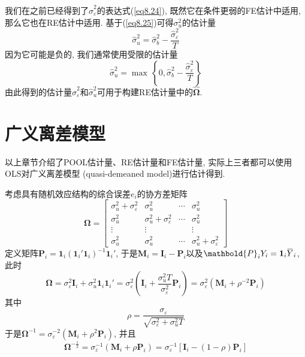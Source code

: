 \documentclass[cn, 12pt, math=mtpro2, bibstyle=apa, blue, twocol]{elegantbook}
\newcommand{\M}{\mathbold{M}}
\newcommand{\BO}{\mathbold{\Omega}}
\newcommand{\overbar}[1]{\mkern 1.5mu\overline{\mkern-1.5mu#1\mkern-1.5mu}\mkern 1.5mu}
\begin{document}
我们在之前已经得到了$\hat{\sigma}_\varepsilon^2$的表达式(\ref{eq8.24}), 既然它在条件更弱的FE估计中适用, 那么它也在RE估计中适用. 基于(\ref{eq8.25})可得$\sigma_u^2$的估计量
$$\hat{\sigma}_u^2=\hat{\sigma}_b^2-\frac{\hat{\sigma}_\varepsilon^2}{T}$$
因为它可能是负的, 我们通常使用受限的估计量
\begin{equation}\label{eq8.26}
  \hat{\sigma}_u^2=\max\,\left\{0,\hat{\sigma}_b^2-\frac{\hat{\sigma}_\varepsilon^2}{T}\right\}
\end{equation}
由此得到的估计量$\hat{\sigma}_\varepsilon^2$和$\hat{\sigma}_u^2$可用于构建RE估计量中的$\hat{\BO}$.
\section{广义离差模型}
以上章节介绍了POOL估计量、RE估计量和FE估计量, 实际上三者都可以使用OLS对广义离差模型 (quasi-demeaned model)进行估计得到.

考虑具有随机效应结构的综合误差$e_i$的协方差矩阵
$$\BO=\begin{bmatrix}
   \sigma_u^2+\sigma_\varepsilon^2 & \sigma_u^2 & \cdots & \sigma_u^2 \\
   \sigma_u^2 & \sigma_u^2+\sigma_\varepsilon^2 & \cdots & \sigma_u^2 \\
   \vdots & \vdots &  & \vdots \\
   \sigma_u^2 & \sigma_u^2 & \cdots & \sigma_u^2+\sigma_\varepsilon^2
 \end{bmatrix}$$
定义矩阵$\mathbold{P}_i=\mathbf{1}_i(\mathbf{1}_i'\mathbf{1}_i)^{-1}\mathbf{1}_i'$, 于是$\mathbold{M}_i=\mathbold{I}_i-\mathbold{P}_i$以及$\mathbold{P}_iY_i=\mathbf{1}_i\overbar{Y}_i$, 此时
$$\BO=\sigma_\varepsilon^2\mathbold{I}_i+\sigma_u^2\mathbf{1}_i\mathbf{1}_i'=\sigma_\varepsilon^2\left(\mathbold{I}_i+\frac{\sigma_u^2T}{\sigma_\varepsilon^2}\mathbold{P}_i\right)=\sigma_\varepsilon^2(\mathbold{M}_i+\rho^{-2}\mathbold{P}_i)$$
其中
\begin{equation}\label{eq8.30}
  \rho=\frac{\sigma_\varepsilon}{\sqrt{\sigma_\varepsilon^2+\sigma_u^2T}}
\end{equation}
于是$\BO^{-1}=\sigma_\varepsilon^{-2}(\M_i+\rho^2\mathbold{P}_i)$, 并且
$$\BO^{-\frac{1}{2}}=\sigma_\varepsilon^{-1}(\M_i+\rho\mathbold{P}_i)=\sigma_\varepsilon^{-1}[\mathbold{I}_i-(1-\rho)\mathbold{P}_i]$$
\end{document}
